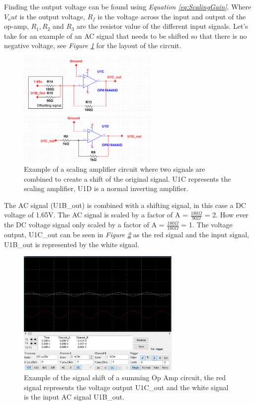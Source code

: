 Finding the output voltage can be found using \textit{Equation \ref{eq:ScalingGain}}.
Where $V_out$ is the output voltage, $R_f$ is the voltage across the input and output of the op-amp, $R_1, R_2$ and $R_3$ are the resistor value of the different input signals.
Let's take for an example of an AC signal that needs to be shifted so that there is no negative voltage, see \textit{Figure \ref{fig:sumCircuitexamp}} for the layout of the circuit.

\begin{figure}[h]
    \centering
    \includegraphics[width=0.60\textwidth]{graphics/sumCircuitexamp.png}
    \caption{Example of a scaling amplifier circuit where two signals are combined to create a shift of the original signal. U1C represents the scaling amplifier, U1D is a normal inverting amplifier.}
    \label{fig:sumCircuitexamp}
\end{figure}

\clearpage

The AC signal (U1B\_out) is combined with a shifting signal, in this case a DC voltage of 1.65V.
The AC signal is scaled by a factor of A = $\frac{180\Omega}{90\Omega}$ = 2.
How ever the DC voltage signal only scaled by a factor of A = $\frac{180\Omega}{180\Omega}$ = 1.
The voltage output, U1C\_out can be seen in \textit{Figure \ref{fig:SummingOpAmpShift}} as the red signal and the input signal, U1B\_out is represented by the white signal.


\begin{figure}[h]
    \centering
    \includegraphics[width=0.70\textwidth]{graphics/summingShift.png}
    \caption{Example of the signal shift of a summing Op Amp circuit, the red signal represents the voltage output U1C\_out and the white signal is the input AC signal U1B\_out.}
    \label{fig:SummingOpAmpShift}
\end{figure}

